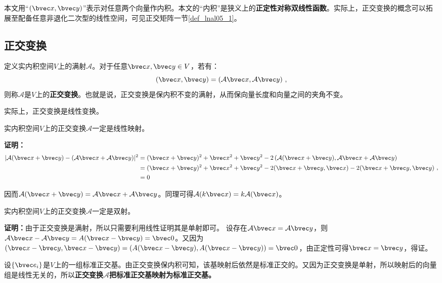 
本文用“$(\bvec x,\bvec y)$”表示对任意两个向量作内积。本文的“内积”是狭义上的\textbf{正定性对称双线性函数}。实际上，正交变换的概念可以拓展至配备任意非退化二次型的线性空间，可见正交矩阵一节\autoref{def_lnal05_1}。
\subsection{正交变换}
\begin{definition}{}\label{def_ortho_1}
定义实内积空间$V$上的满射$\mathcal A$。对于任意$\bvec x,\bvec y\in V$，若有：
\begin{equation}
(\bvec x,\bvec y)=(\mathcal A \bvec x,\mathcal A \bvec y)~,
\end{equation}
则称$\mathcal A$是$V$上的\textbf{正交变换}。也就是说，正交变换是保内积不变的满射，从而保向量长度和向量之间的夹角不变。
\end{definition}
实际上，正交变换是线性变换。
\begin{theorem}{}\label{the_ortho_1}
实内积空间$V$上的正交变换$\mathcal A$一定是线性映射。
\end{theorem}
\textbf{证明：}
\begin{equation}
\begin{aligned}
|\mathcal A(\bvec x+\bvec y)-(\mathcal A\bvec x+\mathcal A\bvec y)|^2&=(\bvec x+\bvec y)^2+\bvec x^2+\bvec y^2-2\left(\mathcal A(\bvec x+\bvec y),\mathcal A\bvec x+\mathcal A\bvec y\right)\\
&=(\bvec x+\bvec y)^2+\bvec x^2+\bvec y^2-2(\bvec x+\bvec y,\bvec x)-2(\bvec x+\bvec y,\bvec y)\\
&=0
\end{aligned}
~,\end{equation}

因而$\mathcal A(\bvec x+\bvec y)=\mathcal A\bvec x+\mathcal A\bvec y$。同理可得$\mathcal A(k\bvec x)=k\mathcal A(\bvec x)$。

\begin{theorem}{}
实内积空间$V$上的正交变换$\mathcal A$一定是双射。
\end{theorem}
\textbf{证明：}由于正交变换是满射，所以只需要利用线性证明其是单射即可。
设存在$\mathcal A\bvec x=\mathcal A\bvec y$，则$\mathcal A\bvec x-\mathcal A\bvec y=A(\bvec x-\bvec y)=\bvec 0$。又因为$(\bvec x-\bvec y,\bvec x-\bvec y)=(A(\bvec x-\bvec y),A(\bvec x-\bvec y))=\bvec 0$，由正定性可得$\bvec x=\bvec y$，得证。

设$\{\bvec e_i\}$是$V$上的一组标准正交基。由正交变换保内积可知，该基映射后依然是标准正交的。又因为正交变换是单射，所以映射后的向量组是线性无关的，所以\textbf{正交变换}$\mathcal A$\textbf{把标准正交基映射为标准正交基。}

